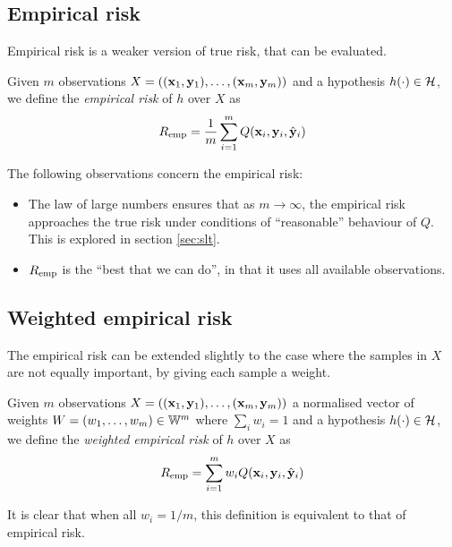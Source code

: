 \subsection{Empirical risk}
\label{sec:empirical risk}
Empirical risk is a weaker version of true risk, that can be
evaluated.

\begin{definition}
Given $m$ observations $X = ((\mathbf{x}_1, \mathbf{y}_1), \ldots, (\mathbf{x}_m,
\mathbf{y}_m))$ and a hypothesis $h(\cdot) \in \mathcal{H}$, we define the
\emph{empirical risk} of $h$ over $X$ as 
%
\begin{equation}
R_{\mathrm{emp}} = \frac{1}{m} \sum_{i=1}^{m} Q(\mathbf{x}_i, \mathbf{y}_i, \hat{\mathbf{y}}_i)
\end{equation}
\end{definition}

The following observations concern the empirical risk:
%
\begin{itemize}
\item 	The law of large numbers ensures that as $m \rightarrow
	\infty$, the empirical risk approaches the true risk under
	conditions of ``reasonable'' behaviour of $Q$.  This is
	explored in section \ref{sec:slt}.
\item	$R_{\mathrm{emp}}$ is the ``best that we can do'', in that it uses all
	available observations.
\end{itemize}


\subsection{Weighted empirical risk}

The empirical risk can be extended slightly to the case where
the samples in $X$ are not equally important, by giving each sample a
weight.

\begin{definition}
Given $m$ observations $X = ((\mathbf{x}_1, \mathbf{y}_1), \ldots, (\mathbf{x}_m,
\mathbf{y}_m))$ a normalised vector of weights $W = (w_1, \ldots, w_m) \in
\mathbb{W}^m$ where $\sum_{i} w_i = 1$ and a hypothesis $h(\cdot) \in
\mathcal{H}$, we define the \emph{weighted empirical risk} of $h$ over $X$ as 
%
\begin{equation}
R_{\mathrm{emp}} = \sum_{i=1}^{m} w_i Q(\mathbf{x}_i, \mathbf{y}_i, \hat{\mathbf{y}}_i)
\end{equation}
\end{definition}

It is clear that when all $w_i = 1/m$, this definition is equivalent
to that of empirical risk.

